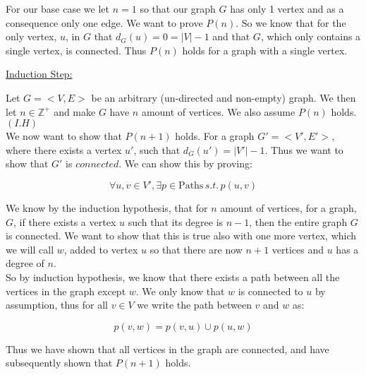 \documentclass[20pt]{article}
\begin{document}
\noindent
\begin{text}
    For our base case we let $n=1$ so that our graph $G$ has only 1 vertex and as a consequence only one edge. We want to prove $P(n)$. So we know that for the only vertex, $u$, in $G$ that $d_{G}(u) = 0 = |V| - 1$ and that $G$, which only contains a single vertex, is connected. Thus $P(n)$ holds for a graph with a single vertex.\\
\end{text}

\noindent
\underline{Induction Step:}

\noindent
\begin{text}
    Let $G = <V,E>$ be an arbitrary (un-directed and non-empty) graph. We then let $n \in \mathbb{Z}^+$ and make $G$ have $n$ amount of vertices. We also assume $P(n)$ holds. $(I.H)$\\

    \noindent We now want to show that $P(n+1)$ holds. For a graph $G' = <V',E'>$, where there exists a vertex $u'$, such that $d_{G}(u') = |V'| - 1$. Thus we want to show that $G'$ is $connected$. We can show this by proving:
\end{text}

\begin{equation}
    \forall u,v \in V', \exists p \in \text{Paths} \, s.t. \, p(u,v) \nonumber
\end{equation}

\noindent
\begin{text}
    We know by the induction hypothesis, that for $n$ amount of vertices, for a graph, $G$, if there exists a vertex $u$ such that its degree is $n-1$, then the entire graph $G$ is connected. We want to show that this is true also with one more vertex, which we will call $w$, added to vertex $u$ so that there are now $n+1$ vertices and $u$ has a degree of $n$.\\
    
    \noindent So by induction hypothesis, we know that there exists a path between all the vertices in the graph except $w$. We only know that $w$ is connected to $u$ by assumption, thus for all $v \in V$ we write the path between $v$ and $w$ as:
\end{text}

\begin{equation}
    p(v,w) = p(v, u) \cup p(u, w)\nonumber
\end{equation}

\noindent
\begin{text}
    Thus we have shown that all vertices in the graph are connected, and have subsequently shown that $P(n+1)$ holds.
\end{text}
\end{document}
